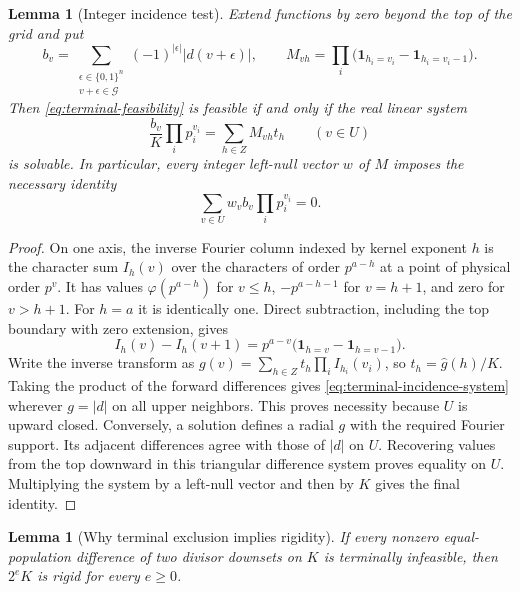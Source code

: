 \documentclass[11pt]{article}
\numberwithin{equation}{section}
\newtheorem{lemma}[theorem]{Lemma}
\theoremstyle{definition}
\theoremstyle{remark}
\begin{document}
\begin{lemma}[Integer incidence test]
\label{lem:terminal-incidence}
Extend functions by zero beyond the top of the grid and put
\[
b_v=\sum_{\substack{\epsilon\in\{0,1\}^n\\v+\epsilon\in\mathcal G}}
       (-1)^{|\epsilon|}|d(v+\epsilon)|,
\qquad
M_{vh}=\prod_i\bigl(\mathbf1_{h_i=v_i}-\mathbf1_{h_i=v_i-1}\bigr).
\]
Then \eqref{eq:terminal-feasibility} is feasible if and only if the
real linear system
\begin{equation}
\frac{b_v}{K}\prod_i p_i^{v_i}
       =\sum_{h\in Z}M_{vh}t_h\qquad(v\in U)
\label{eq:terminal-incidence-system}
\end{equation}
is solvable. In particular, every integer left-null vector \(w\)
of \(M\) imposes the necessary identity
\[
\sum_{v\in U}w_vb_v\prod_i p_i^{v_i}=0.
\]
\end{lemma}

\begin{proof}
On one axis, the inverse Fourier column indexed by kernel exponent
\(h\) is the character sum \(I_h(v)\) over the characters of order
\(p^{a-h}\) at a point of physical order \(p^v\). It has values
\(\varphi(p^{a-h})\) for \(v\le h\),
\(-p^{a-h-1}\) for \(v=h+1\), and zero for \(v>h+1\).
For \(h=a\) it is identically one. Direct subtraction, including
the top boundary with zero extension, gives
\[
I_h(v)-I_h(v+1)
=p^{a-v}\bigl(\mathbf1_{h=v}-\mathbf1_{h=v-1}\bigr).
\]
Write the inverse transform as
\(g(v)=\sum_{h\in Z}t_h\prod_i I_{h_i}(v_i)\), so
\(t_h=\widehat g(h)/K\). Taking the product of the forward
differences gives \eqref{eq:terminal-incidence-system} wherever
\(g=|d|\) on all upper neighbors. This proves necessity because
\(U\) is upward closed. Conversely, a solution defines a radial
\(g\) with the required Fourier support. Its adjacent differences
agree with those of \(|d|\) on \(U\). Recovering values from the
top downward in this triangular difference system proves equality on
\(U\). Multiplying the system by a left-null vector and then by
\(K\) gives the final identity.
\end{proof}

\begin{lemma}[Why terminal exclusion implies rigidity]
\label{lem:terminal-implies-rigidity}
If every nonzero equal-population difference of two divisor downsets
on \(K\) is terminally infeasible, then \(2^eK\) is rigid for
every \(e\ge0\).
\end{lemma}
\end{document}
